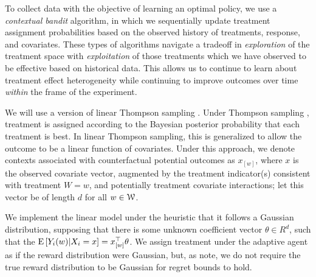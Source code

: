 \documentclass[letterpaper, 12pt, parskip=full,DIV=10]{scrartcl}
\begin{document}
To collect data with the objective of learning an optimal policy, we use a \textit{contextual bandit} algorithm, in which we sequentially update treatment assignment probabilities based on the observed history of treatments, response, and covariates. These types of algorithms navigate a tradeoff in \textit{exploration} of the treatment space with \textit{exploitation} of those treatments which we have observed to be effective based on historical data. This allows us to continue to learn about treatment effect heterogeneity while continuing to improve outcomes over time \textit{within} the frame of the experiment. 

We will use a version of linear Thompson sampling \citep{agrawal2013thompson}. Under Thompson sampling \citep{thompson1933likelihood,thompson1935theory}, treatment is assigned according to the Bayesian posterior probability that each treatment is best. In linear Thompson sampling, this is generalized to allow the outcome to be a linear function of covariates. Under this approach, we denote contexts associated with counterfactual potential outcomes as $x_{[w]}$, where $x$ is the observed covariate vector, augmented by the treatment indicator(s) consistent with treatment $W =w$, and potentially treatment covariate interactions; let this vector be of length $d$ for all $w \in {\EuScript W}$. 

We implement the linear model under the heuristic that it follows a Gaussian distribution, supposing that there is some unknown coefficient vector $\theta\in R^{d}$, such that the ${\textrm E}\,[Y_i(w)|X_i = x] = x_{[w]}^\top \theta$. %
We assign treatment under the adaptive agent as if the reward distribution were Gaussian, but, as \cite{agrawal2013thompson} note, we do not require the true reward distribution to be Gaussian for regret bounds to hold. 

\end{document}
